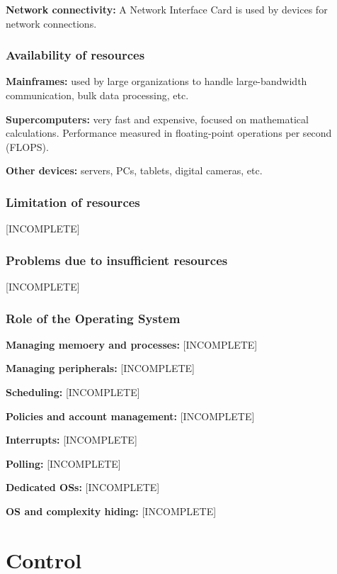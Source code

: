\documentclass{article}
\begin{document}
\textbf{Network connectivity:} A Network Interface Card is used by devices for
network connections.

\subsubsection{Availability of resources}

\textbf{Mainframes:} used by large organizations to handle large-bandwidth
communication, bulk data processing, etc.

\textbf{Supercomputers:} very fast and expensive, focused on mathematical
calculations. Performance measured in floating-point operations per second
(FLOPS).

\textbf{Other devices:} servers, PCs, tablets, digital cameras, etc.

\subsubsection{Limitation of resources}
[INCOMPLETE]

\subsubsection{Problems due to insufficient resources}
[INCOMPLETE]

\subsubsection{Role of the Operating System}

\textbf{Managing memoery and processes:} [INCOMPLETE]

\textbf{Managing peripherals:} [INCOMPLETE]

\textbf{Scheduling:} [INCOMPLETE]

\textbf{Policies and account management:} [INCOMPLETE]

\textbf{Interrupts:} [INCOMPLETE]

\textbf{Polling:} [INCOMPLETE]

\textbf{Dedicated OSs:} [INCOMPLETE]

\textbf{OS and complexity hiding:} [INCOMPLETE]

\section{Control}
\end{document}
